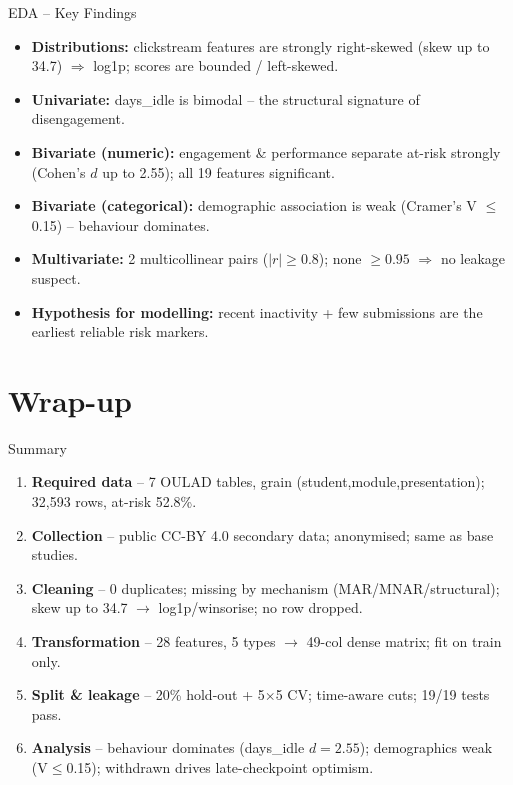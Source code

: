 \documentclass[aspectratio=169,10pt]{beamer}
\newcommand{\tcode}[1]{{\ttfamily #1}}
\begin{document}
\begin{frame}{EDA -- Key Findings}
  \footnotesize
  \begin{itemize}\setlength\itemsep{0.5em}
    \item \textbf{Distributions:} clickstream features are strongly right-skewed (skew up to \alert{34.7}) $\Rightarrow$ log1p; scores are bounded / left-skewed.
    \item \textbf{Univariate:} \tcode{days\_idle} is \alert{bimodal} -- the structural signature of disengagement.
    \item \textbf{Bivariate (numeric):} engagement \& performance separate at-risk strongly (Cohen's $d$ up to \alert{2.55}); all 19 features significant.
    \item \textbf{Bivariate (categorical):} demographic association is weak (Cramer's V $\leq$ 0.15) -- behaviour dominates.
    \item \textbf{Multivariate:} 2 multicollinear pairs ($|r|\geq0.8$); none $\geq0.95$ $\Rightarrow$ no leakage suspect.
    \item \textbf{Hypothesis for modelling:} recent inactivity + few submissions are the earliest reliable risk markers.
  \end{itemize}
\end{frame}

\section*{Wrap-up}

\begin{frame}{Summary}
  \footnotesize
  \begin{enumerate}\setlength\itemsep{0.5em}
    \item[\alert{\textbf{01}}] \textbf{Required data} -- 7 OULAD tables, grain \tcode{(student,module,presentation)}; 32,593 rows, at-risk 52.8\%.
    \item[\alert{\textbf{02}}] \textbf{Collection} -- public CC-BY 4.0 secondary data; anonymised; same as base studies.
    \item[\alert{\textbf{03}}] \textbf{Cleaning} -- 0 duplicates; missing by mechanism (MAR/MNAR/structural); skew up to 34.7 $\to$ log1p/winsorise; no row dropped.
    \item[\alert{\textbf{04}}] \textbf{Transformation} -- 28 features, 5 types $\to$ 49-col dense matrix; fit on train only.
    \item[\alert{\textbf{05}}] \textbf{Split \& leakage} -- 20\% hold-out + 5$\times$5 CV; time-aware cuts; 19/19 tests pass.
    \item[\alert{\textbf{06}}] \textbf{Analysis} -- behaviour dominates (\tcode{days\_idle} $d=2.55$); demographics weak (V$\leq$0.15); withdrawn drives late-checkpoint optimism.
  \end{enumerate}
\end{frame}
\end{document}
